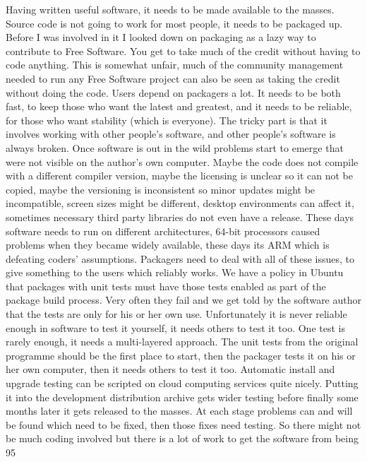 Having written useful software, it needs to be made available to the masses.  Source code is not going to work for most people, it needs to be packaged up.  Before I was involved in it I looked down on packaging as a lazy way to contribute to Free Software.  You get to take much of the credit without having to code anything.  This is somewhat unfair, much of the community management needed to run any Free Software project can also be seen as taking the credit without doing the code.
Users depend on packagers a lot.  It needs to be both fast, to keep those who want the latest and greatest, and it needs to be reliable, for those who want stability (which is everyone).  The tricky part is that it involves working with other people’s software, and other people’s software is always broken.  Once software is out in the wild problems start to emerge that were not visible on the author’s own computer.  Maybe the code does not compile with a different compiler version, maybe the licensing is unclear so it can not be copied, maybe the versioning is inconsistent so minor updates might be incompatible, screen sizes might be different, desktop environments can affect it, sometimes necessary third party libraries do not even have a release.  These days software needs to run on different architectures, 64-bit processors caused problems when they became widely available, these days its ARM which is defeating coders’ assumptions.  Packagers need to deal with all of these issues, to give something to the users which reliably works.  
We have a policy in Ubuntu that packages with unit tests must have those tests enabled as part of the package build process.  Very often they fail and we get told by the software author that the tests are only for his or her own use.  Unfortunately it is never reliable enough in software to test it yourself, it needs others to test it too.  One test is rarely enough, it needs a multi-layered approach.  The unit tests from the original programme should be the first place to start, then the packager tests it on his or her own computer, then it needs others to test it too.  Automatic install and upgrade testing can be scripted on cloud computing services quite nicely.  Putting it into the development distribution archive gets wider testing before finally some months later it gets released to the masses.  At each stage problems can and will be found which need to be fixed, then those fixes need testing.  So there might not be much coding involved but there is a lot of work to get the software from being 95%
